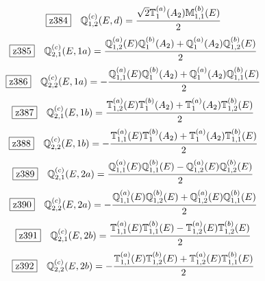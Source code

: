 \documentclass[fleqn,10pt,landscape]{jsarticle}
\begin{document}
\begin{dmath*}
\hspace*{3mm}\fbox{z384}\quad \mathbb{Q}_{1,2}^{(c)}(E,d)=\frac{\sqrt{2} \mathbb{T}_{1}^{(a)}(A_{2}) \mathbb{M}_{1,1}^{(b)}(E)}{2}
\end{dmath*}
\begin{dmath*}
\hspace*{3mm}\fbox{z385}\quad \mathbb{Q}_{2,1}^{(c)}(E,1a)=\frac{\mathbb{Q}_{1,2}^{(a)}(E) \mathbb{Q}_{1}^{(b)}(A_{2}) + \mathbb{Q}_{1}^{(a)}(A_{2}) \mathbb{Q}_{1,2}^{(b)}(E)}{2}
\end{dmath*}
\begin{dmath*}
\hspace*{3mm}\fbox{z386}\quad \mathbb{Q}_{2,2}^{(c)}(E,1a)=- \frac{\mathbb{Q}_{1,1}^{(a)}(E) \mathbb{Q}_{1}^{(b)}(A_{2}) + \mathbb{Q}_{1}^{(a)}(A_{2}) \mathbb{Q}_{1,1}^{(b)}(E)}{2}
\end{dmath*}
\begin{dmath*}
\hspace*{3mm}\fbox{z387}\quad \mathbb{Q}_{2,1}^{(c)}(E,1b)=\frac{\mathbb{T}_{1,2}^{(a)}(E) \mathbb{T}_{1}^{(b)}(A_{2}) + \mathbb{T}_{1}^{(a)}(A_{2}) \mathbb{T}_{1,2}^{(b)}(E)}{2}
\end{dmath*}
\begin{dmath*}
\hspace*{3mm}\fbox{z388}\quad \mathbb{Q}_{2,2}^{(c)}(E,1b)=- \frac{\mathbb{T}_{1,1}^{(a)}(E) \mathbb{T}_{1}^{(b)}(A_{2}) + \mathbb{T}_{1}^{(a)}(A_{2}) \mathbb{T}_{1,1}^{(b)}(E)}{2}
\end{dmath*}
\begin{dmath*}
\hspace*{3mm}\fbox{z389}\quad \mathbb{Q}_{2,1}^{(c)}(E,2a)=\frac{\mathbb{Q}_{1,1}^{(a)}(E) \mathbb{Q}_{1,1}^{(b)}(E) - \mathbb{Q}_{1,2}^{(a)}(E) \mathbb{Q}_{1,2}^{(b)}(E)}{2}
\end{dmath*}
\begin{dmath*}
\hspace*{3mm}\fbox{z390}\quad \mathbb{Q}_{2,2}^{(c)}(E,2a)=- \frac{\mathbb{Q}_{1,1}^{(a)}(E) \mathbb{Q}_{1,2}^{(b)}(E) + \mathbb{Q}_{1,2}^{(a)}(E) \mathbb{Q}_{1,1}^{(b)}(E)}{2}
\end{dmath*}
\begin{dmath*}
\hspace*{3mm}\fbox{z391}\quad \mathbb{Q}_{2,1}^{(c)}(E,2b)=\frac{\mathbb{T}_{1,1}^{(a)}(E) \mathbb{T}_{1,1}^{(b)}(E) - \mathbb{T}_{1,2}^{(a)}(E) \mathbb{T}_{1,2}^{(b)}(E)}{2}
\end{dmath*}
\begin{dmath*}
\hspace*{3mm}\fbox{z392}\quad \mathbb{Q}_{2,2}^{(c)}(E,2b)=- \frac{\mathbb{T}_{1,1}^{(a)}(E) \mathbb{T}_{1,2}^{(b)}(E) + \mathbb{T}_{1,2}^{(a)}(E) \mathbb{T}_{1,1}^{(b)}(E)}{2}
\end{dmath*}
\end{document}
